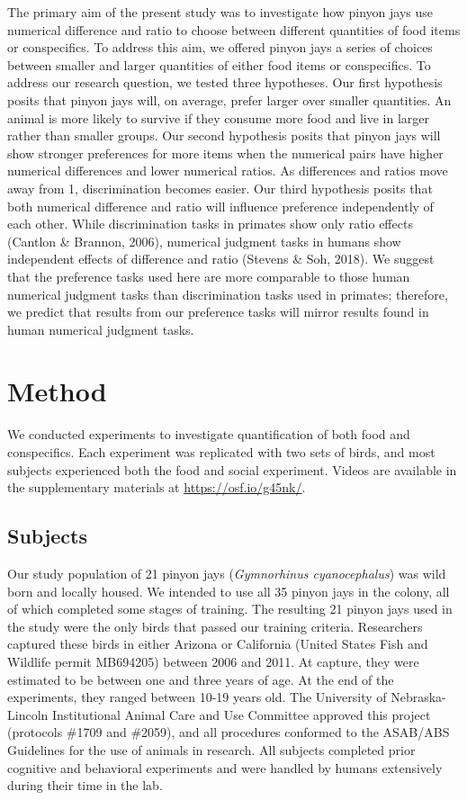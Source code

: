 \documentclass[
  ,pub,floatsintext]{apa6}
\begin{document}
The primary aim of the present study was to investigate how pinyon jays use numerical difference and ratio to choose between different quantities of food items or conspecifics. To address this aim, we offered pinyon jays a series of choices between smaller and larger quantities of either food items or conspecifics. To address our research question, we tested three hypotheses. Our first hypothesis posits that pinyon jays will, on average, prefer larger over smaller quantities. An animal is more likely to survive if they consume more food and live in larger rather than smaller groups. Our second hypothesis posits that pinyon jays will show stronger preferences for more items when the numerical pairs have higher numerical differences and lower numerical ratios. As differences and ratios move away from 1, discrimination becomes easier. Our third hypothesis posits that both numerical difference and ratio will influence preference independently of each other. While discrimination tasks in primates show only ratio effects (Cantlon \& Brannon, 2006), numerical judgment tasks in humans show independent effects of difference and ratio (Stevens \& Soh, 2018). We suggest that the preference tasks used here are more comparable to those human numerical judgment tasks than discrimination tasks used in primates; therefore, we predict that results from our preference tasks will mirror results found in human numerical judgment tasks.

\hypertarget{method}{%
\section{Method}\label{method}}

We conducted experiments to investigate quantification of both food and conspecifics. Each experiment was replicated with two sets of birds, and most subjects experienced both the food and social experiment. Videos are available in the supplementary materials at \url{https://osf.io/g45nk/}.

\hypertarget{subjects}{%
\subsection{Subjects}\label{subjects}}

Our study population of 21 pinyon jays (\emph{Gymnorhinus cyanocephalus}) was wild born and locally housed. We intended to use all 35 pinyon jays in the colony, all of which completed some stages of training. The resulting 21 pinyon jays used in the study were the only birds that passed our training criteria. Researchers captured these birds in either Arizona or California (United States Fish and Wildlife permit MB694205) between 2006 and 2011. At capture, they were estimated to be between one and three years of age. At the end of the experiments, they ranged between 10-19 years old. The University of Nebraska-Lincoln Institutional Animal Care and Use Committee approved this project (protocols \#1709 and \#2059), and all procedures conformed to the ASAB/ABS Guidelines for the use of animals in research. All subjects completed prior cognitive and behavioral experiments and were handled by humans extensively during their time in the lab.
\end{document}
